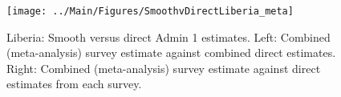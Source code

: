 \documentclass[12pt]{article}\usepackage[]{graphicx}\usepackage[]{color}
\newenvironment{knitrout}{}{} %
\begin{document}

\begin{knitrout}
\color{fgcolor}\begin{figure}[bht]

{\centering \texttt{[image: ../Main/Figures/SmoothvDirectLiberia\_meta]} 

}

\caption[Liberia]{Liberia: Smooth versus direct Admin 1 estimates. Left: Combined (meta-analysis) survey estimate against combined direct estimates. Right: Combined (meta-analysis) survey estimate against direct estimates from each survey.}\label{fig:unnamed-chunk-183}
\end{figure}


\end{knitrout}
\end{document}
